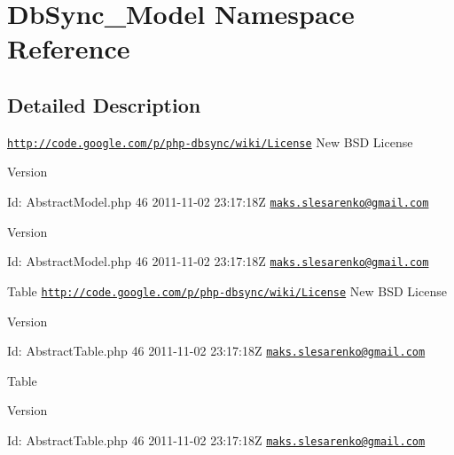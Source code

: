 \hypertarget{namespaceDbSync__Model}{
\section{DbSync\_\-Model Namespace Reference}
\label{namespaceDbSync__Model}
}


\subsection{Detailed Description}
\href{http://code.google.com/p/php-dbsync/wiki/License}{\tt http://code.google.com/p/php-\/dbsync/wiki/License} New BSD License \begin{DoxyVersion}{Version}

\end{DoxyVersion}
\begin{DoxyParagraph}{Id:}
AbstractModel.php 46 2011-\/11-\/02 23:17:18Z \href{mailto:maks.slesarenko@gmail.com}{\tt maks.slesarenko@gmail.com} 
\end{DoxyParagraph}


\begin{DoxyVersion}{Version}

\end{DoxyVersion}
\begin{DoxyParagraph}{Id:}
AbstractModel.php 46 2011-\/11-\/02 23:17:18Z \href{mailto:maks.slesarenko@gmail.com}{\tt maks.slesarenko@gmail.com} 
\end{DoxyParagraph}


Table  \href{http://code.google.com/p/php-dbsync/wiki/License}{\tt http://code.google.com/p/php-\/dbsync/wiki/License} New BSD License \begin{DoxyVersion}{Version}

\end{DoxyVersion}
\begin{DoxyParagraph}{Id:}
AbstractTable.php 46 2011-\/11-\/02 23:17:18Z \href{mailto:maks.slesarenko@gmail.com}{\tt maks.slesarenko@gmail.com} 
\end{DoxyParagraph}


Table \begin{DoxyVersion}{Version}

\end{DoxyVersion}
\begin{DoxyParagraph}{Id:}
AbstractTable.php 46 2011-\/11-\/02 23:17:18Z \href{mailto:maks.slesarenko@gmail.com}{\tt maks.slesarenko@gmail.com} 
\end{DoxyParagraph}


